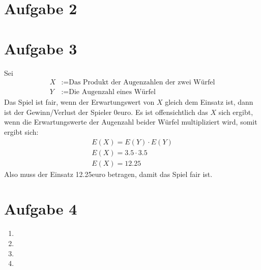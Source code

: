 \documentclass[a4paper,10pt]{article}
\begin{document}
\section*{Aufgabe 2}
\section*{Aufgabe 3}
Sei
\begin{align*}
    X &:= \text{Das Produkt der Augenzahlen der zwei Würfel} \\
    Y &:= \text{Die Augenzahl eines Würfel}
\end{align*}
Das Spiel ist fair, wenn der Erwartungswert von $X$ gleich dem Einsatz ist, dann ist der Gewinn/Verlust der Spieler 0euro. Es ist offensichtlich das $X$ sich ergibt, wenn die Erwartungswerte der Augenzahl beider Würfel multipliziert wird, somit ergibt sich:
\begin{align*}
    E(X) = E(Y) \cdot E(Y) \\
    E(X) = 3.5 \cdot 3.5 \\
    E(X) = 12.25
\end{align*}
Also muss der Einsatz 12.25euro betragen, damit das Spiel fair ist.
\section*{Aufgabe 4}
    \begin{enumerate}[~~a.)]
        \item
        \item
        \item
        \item
    \end{enumerate}
\end{document}
